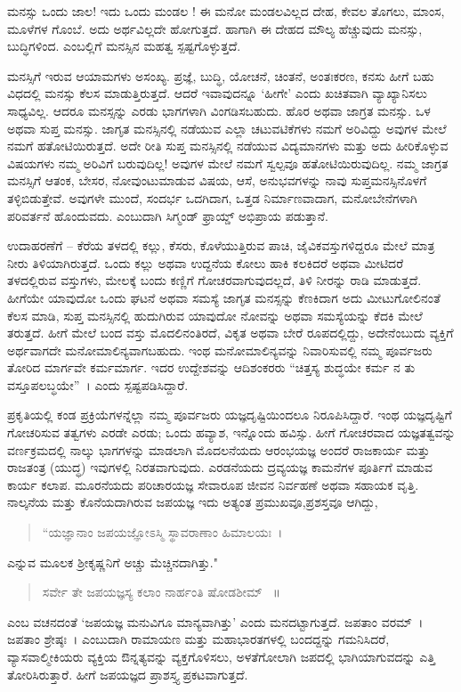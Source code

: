 {ಮನಸ್ಸು ಒಂದು ಜಾಲ! ಇದು ಒಂದು ಮಂಡಲ ! ಈ ಮನೋ ಮಂಡಲವಿಲ್ಲದ ದೇಹ, ಕೇವಲ ತೊಗಲು, ಮಾಂಸ, ಮೂಳೆಗಳ ಗೊಂಬೆ. ಅದು ಅರ್ಥವಿಲ್ಲದೇ ಹೋಗುತ್ತದೆ. ಹಾಗಾಗಿ ಈ ದೇಹದ ಮೌಲ್ಯ ಹೆಚ್ಚುವುದು ಮನಸ್ಸು, ಬುದ್ಧಿಗಳಿಂದ. ಎಂಬಲ್ಲಿಗೆ ಮನಸ್ಸಿನ ಮಹತ್ವ ಸ್ಪಷ್ಟಗೊಳ್ಳುತ್ತದೆ.

ಮನಸ್ಸಿಗೆ ಇರುವ ಆಯಾಮಗಳು ಅಸಂಖ್ಯ. ಪ್ರಜ್ಞೆ, ಬುದ್ಧಿ, ಯೋಚನೆ, ಚಿಂತನೆ, ಅಂತಃಕರಣ, ಕನಸು ಹೀಗೆ ಬಹು ವಿಧದಲ್ಲಿ ಮನಸ್ಸು ಕೆಲಸ ಮಾಡುತ್ತಿರುತ್ತದೆ. ಆದರೆ ಇವಾವುದನ್ನೂ ‘ಹೀಗೇ’ ಎಂದು ಖಚಿತವಾಗಿ ವ್ಯಾಖ್ಯಾನಿಸಲು ಸಾಧ್ಯವಿಲ್ಲ. ಆದರೂ ಮನಸ್ಸನ್ನು ಎರಡು ಭಾಗಗಳಾಗಿ ವಿಂಗಡಿಸಬಹುದು. ಹೊರ ಅಥವಾ ಜಾಗ್ರತ ಮನಸ್ಸು. ಒಳ ಅಥವಾ ಸುಪ್ತ ಮನಸ್ಸು. ಜಾಗೃತ ಮನಸ್ಸಿನಲ್ಲಿ ನಡೆಯುವ ಎಲ್ಲಾ ಚಟುವಟಿಕೆಗಳು ನಮಗೆ ಅರಿವಿದ್ದು ಅವುಗಳ ಮೇಲೆ ನಮಗೆ ಹತೋಟಿಯಿರುತ್ತದೆ. ಅದೇ ರೀತಿ ಸುಪ್ತ ಮನಸ್ಸಿನಲ್ಲಿ ನಡೆಯುವ ವಿದ್ಯಮಾನಗಳು ಮತ್ತು ಅದು ಹೀರಿಕೊಳ್ಳುವ ವಿಷಯಗಳು ನಮ್ಮ ಅರಿವಿಗೆ ಬರುವುದಿಲ್ಲ! ಅವುಗಳ ಮೇಲೆ ನಮಗೆ ಸ್ವಲ್ಪವೂ ಹತೋಟಿಯಿರುವುದಿಲ್ಲ. ನಮ್ಮ ಜಾಗ್ರತ ಮನಸ್ಸಿಗೆ ಆತಂಕ, ಬೇಸರ, ನೋವುಂಟುಮಾಡುವ ವಿಷಯ, ಆಸೆ, ಅನುಭವಗಳನ್ನು ನಾವು ಸುಪ್ತಮನಸ್ಸಿನೊಳಗೆ ತಳ್ಳಿಬಿಡುತ್ತೇವೆ. ಅವುಗಳೇ ಮುಂದೆ, ಸಂದರ್ಭ ಒದಗಿದಾಗ, ಒತ್ತಡ ನಿರ್ಮಾಣವಾದಾಗ, ಮನೋಬೇನೆಗಳಾಗಿ ಪರಿವರ್ತನೆ ಹೊಂದುವದು. ಎಂಬುದಾಗಿ ಸಿಗ್ಮಂಡ್‌ ಫ್ರಾಯ್ಡ್ ಅಭಿಪ್ರಾಯ ಪಡುತ್ತಾನೆ.

ಉದಾಹರಣೆಗೆ – ಕೆರೆಯ ತಳದಲ್ಲಿ ಕಲ್ಲು, ಕೆಸರು, ಕೊಳೆಯುತ್ತಿರುವ ಪಾಚಿ, ಜೈವಿಕ\-ವಸ್ತುಗಳಿದ್ದರೂ ಮೇಲೆ ಮಾತ್ರ ನೀರು ತಿಳಿಯಾಗಿರುತ್ತದೆ. ಒಂದು ಕಲ್ಲು ಅಥವಾ ಉದ್ದನೆಯ ಕೋಲು ಹಾಕಿ ಕಲಕಿದರೆ ಅಥವಾ ಮೀಟಿದರೆ ತಳದಲ್ಲಿರುವ ವಸ್ತುಗಳು, ಮೇಲಕ್ಕೆ ಬಂದು ಕಣ್ಣಿಗೆ ಗೋಚರವಾಗುವುದಲ್ಲದೆ, ತಿಳಿ ನೀರನ್ನು ರಾಡಿ ಮಾಡುತ್ತದೆ. ಹೀಗೆಯೇ ಯಾವುದೋ ಒಂದು ಘಟನೆ ಅಥವಾ ಸಮಸ್ಯೆ ಜಾಗೃತ ಮನಸ್ಸನ್ನು ಕೆಣಕಿ\-ದಾಗ ಅದು ಮೀಟುಗೋಲಿನಂತೆ ಕೆಲಸ ಮಾಡಿ, ಸುಪ್ತ ಮನಸ್ಸಿನಲ್ಲಿ ಹುದುಗಿರುವ ಯಾವುದೋ ನೋವನ್ನು ಅಥವಾ ಸಮಸ್ಯೆಯನ್ನು ಕೆದಕಿ ಮೇಲೆ ತರುತ್ತದೆ. ಹೀಗೆ ಮೇಲೆ ಬಂದ ವಸ್ತು ಮೊದಲಿನಂತಿರದೆ, ವಿಕೃತ ಅಥವಾ ಬೇರೆ ರೂಪದಲ್ಲಿದ್ದು, ಅದೇ\-ನೆಂಬುದು ವ್ಯಕ್ತಿಗೆ ಅರ್ಥವಾಗದೇ ಮನೋಮಾಲಿನ್ಯವಾಗಬಹುದು. ಇಂಥ ಮನೋಮಾಲಿನ್ಯವನ್ನು ನಿವಾರಿಸುವಲ್ಲಿ ನಮ್ಮ ಪೂರ್ವಜರು ತೋರಿದ ಮಾರ್ಗವೇ ಕರ್ಮಮಾರ್ಗ. ಇದರ ಉದ್ದೇಶವನ್ನು ಆದಿಶಂಕರರು “ಚಿತ್ತಸ್ಯ ಶುದ್ಧಯೇ ಕರ್ಮ ನ ತು ವಸ್ತೂಪಲಬ್ಧಯೇ”~। ಎಂದು ಸ್ಪಷ್ಟಪಡಿಸಿದ್ದಾರೆ.

ಪ್ರಕೃತಿಯಲ್ಲಿ ಕಂಡ ಪ್ರಕ್ರಿಯೆಗಳನ್ನೆಲ್ಲಾ ನಮ್ಮ ಪೂರ್ವಜರು ಯಜ್ಞದೃಷ್ಟಿ\-ಯಿಂದಲೂ ನಿರೂಪಿಸಿದ್ದಾರೆ. ಇಂಥ ಯಜ್ಞದೃಷ್ಟಿಗೆ ಗೋಚರಿಸುವ ತತ್ವಗಳು ಎರಡೇ ಎರಡು; ಒಂದು ಹವ್ಯಾಶ, ಇನ್ನೊಂದು ಹವಿಸ್ಸು. ಹೀಗೆ ಗೋಚರವಾದ ಯಜ್ಞತತ್ವವನ್ನು ವರ್ಣಕ್ರಮದಲ್ಲಿ ನಾಲ್ಕು ಭಾಗಗಳನ್ನು ಮಾಡಲಾಗಿ \enginline{-} ಮೊದಲನೆಯದು ಆರಂಭಯಜ್ಞ \enginline{-} ಅಂದರೆ ರಾಜಕಾರ್ಯ ಮತ್ತು ರಾಜತಂತ್ರ (ಯುದ್ಧ) ಇವುಗಳಲ್ಲಿ ನಿರತವಾಗುವುದು. ಎರಡನೆಯದು ದ್ರವ್ಯಯಜ್ಞ \enginline{-} ಕಾಮನೆಗಳ ಪೂರ್ತಿಗೆ ಮಾಡುವ ಕಾರ್ಯ ಕಲಾಪ. ಮೂರನೆಯದು ಪರಿಚಾರಯಜ್ಞ \enginline{-} ಸೇವಾರೂಪ ಜೀವನ ನಿರ್ವಹಣೆ ಅಥವಾ ಸಹಾಯಕ ವೃತ್ತಿ. ನಾಲ್ಕನೆಯ ಮತ್ತು ಕೊನೆಯದಾಗಿರುವ ಜಪಯಜ್ಞ \enginline{-} ಇದು ಅತ್ಯಂತ ಪ್ರಮುಖವೂ,\break ಪ್ರಶಸ್ತವೂ ಆಗಿದ್ದು, 
\begin{verse}
“ಯಜ್ಞಾನಾಂ ಜಪಯಜ್ಞೋಽಸ್ಮಿ ಸ್ಥಾವರಾಣಾಂ ಹಿಮಾಲಯಃ~।
\end{verse}
ಎನ್ನುವ ಮೂಲಕ ಶ್ರೀಕೃಷ್ಣನಿಗೆ ಅಚ್ಚು ಮೆಚ್ಚಿನದಾಗಿತ್ತು." 
\begin{verse}
ಸರ್ವೇ ತೇ ಜಪಯಜ್ಞಸ್ಯ ಕಲಾಂ ನಾರ್ಹಂತಿ ಷೋಡಶೀಮ್ ~॥
\end{verse}
ಎಂಬ ವಚನದಂತೆ ‘ಜಪಯಜ್ಞ ಮನುವಿಗೂ ಮಾನ್ಯವಾಗಿತ್ತು’ ಎಂದು ಮನದಟ್ಟಾ\-ಗುತ್ತದೆ. ಜಪತಾಂ ವರಮ್~। ಜಪತಾಂ ಶ್ರೇಷ್ಠಃ~। ಎಂಬುದಾಗಿ ರಾಮಾಯಣ ಮತ್ತು ಮಹಾಭಾರತಗಳಲ್ಲಿ ಬಂದದ್ದನ್ನು ಗಮನಿಸಿದರೆ, ವ್ಯಾಸವಾಲ್ಮೀಕಿಯರು ವ್ಯಕ್ತಿಯ ಔನ್ನತ್ಯ\-ವನ್ನು ವ್ಯಕ್ತಗೊಳಿಸಲು, ಅಳತೆಗೋಲಾಗಿ ಜಪದಲ್ಲಿ ಭಾಗಿಯಾಗುವದನ್ನು ಎತ್ತಿ ತೋರಿಸಿರುತ್ತಾರೆ. ಹೀಗೆ ಜಪಯಜ್ಞದ ಪ್ರಾಶಸ್ತ್ಯ ಪ್ರಕಟವಾಗುತ್ತದೆ.

}

